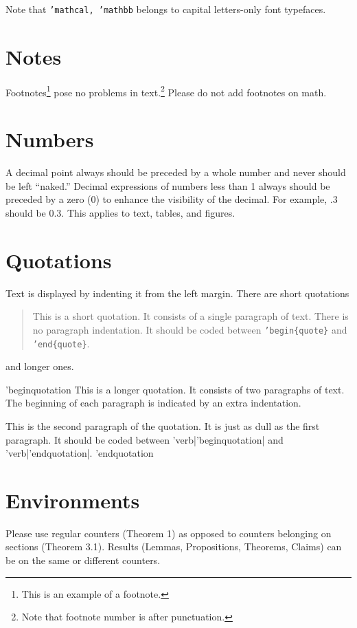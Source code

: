 \documentclass[qe,nameyear,draft]{econsocart}
\theoremstyle{plain}
\begin{document}
Note that \texttt{'mathcal, 'mathbb} belongs to capital letters-only font typefaces.

\section{Notes}

Footnotes\footnote{This is an example of a footnote.}
pose no problems in text.\footnote{Note that footnote number is after punctuation.} Please do not add footnotes on math.

\section{Numbers}

A decimal point always should be preceded by a whole number and never should be left ``naked.'' Decimal expressions of numbers less than 1 always should be preceded by a zero (0) to enhance the visibility of the decimal. For example, .3 should be 0.3. This applies to text, tables, and figures.

\section{Quotations}

Text is displayed by indenting it from the left margin. There are short quotations

\begin{quote}
This is a short quotation. It consists of a
single paragraph of text. There is no paragraph
indentation. It should be coded between \texttt{'begin\{quote\}} and \texttt{'end\{quote\}}.
\end{quote}

and longer ones.


'begin{quotation}
This is a longer quotation.  It consists of two paragraphs
of text.  The beginning of each paragraph is indicated
by an extra indentation.

This is the second paragraph of the quotation.  It is just
as dull as the first paragraph. It should be coded between 'verb|'begin{quotation}| and 'verb|'end{quotation}|.
'end{quotation}
\section{Environments}

Please use regular counters (Theorem 1) as opposed to counters belonging on sections (Theorem 3.1). Results (Lemmas, Propositions, Theorems, Claims) can be on the same or different counters.
\end{document}
